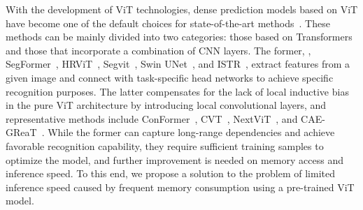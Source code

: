 With the development of ViT technologies, dense prediction models based on ViT have become one of the default choices for state-of-the-art methods~\citep{liu2021swin,wang2021pyramid,dosovitskiy2020image}. These methods can be mainly divided into two categories: those based on Transformers and those that incorporate a combination of CNN layers. The former, \eg, SegFormer~\citep{strudel2021segmenter}, HRViT~\citep{gu2022multi}, Segvit~\citep{zhang2022segvit}, Swin UNet~\citep{hatamizadeh2021swin}, and ISTR~\citep{hu2021istr}, extract features from a given image and connect with task-specific head networks to achieve specific recognition purposes. The latter compensates for the lack of local inductive bias in the pure ViT architecture by introducing local convolutional layers, and representative methods include ConFormer~\citep{peng2021conformer}, CVT~\citep{wu2021cvt}, NextViT~\citep{li2022next}, and CAE-GReaT~\citep{zhang2023cae}. While the former can capture long-range dependencies and achieve favorable recognition capability, they require sufficient training samples to optimize the model, and further improvement is needed on memory access and inference speed. To this end, we propose a solution to the problem of limited inference speed caused by frequent memory consumption using a pre-trained ViT model.%



